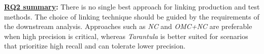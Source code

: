 



\begin{tcolorbox}
\noindent\textbf{\underline{RQ2 summary}:}
There is no single best approach for linking production and test methods. The choice of linking technique should be guided by the requirements of the downstream analysis.
Approaches such as \emph{NC} and \emph{OMC+NC} are preferable when high precision is critical, whereas \emph{Tarantula} is better suited for scenarios that prioritize high recall and can tolerate lower precision.
\end{tcolorbox}
